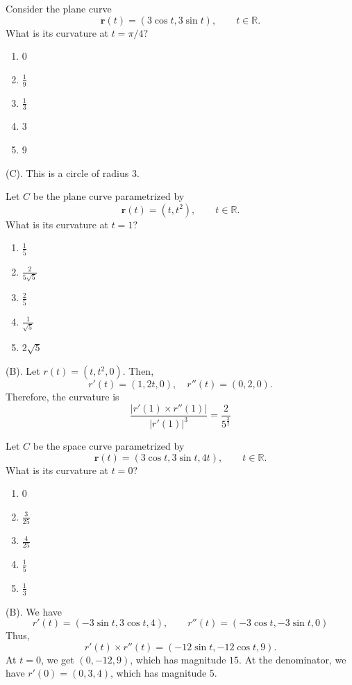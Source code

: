 \begin{exercise}
Consider the plane curve
\[
\mathbf{r}(t)
=
(3\cos t,3\sin t),
\qquad t\in\mathbb{R}.
\]
What is its curvature at $t=\pi/4$?
\begin{enumerate}[label=(\Alph*)]
\item $0$
\item $\frac19$
\item $\frac13$
\item $3$
\item $9$
\end{enumerate}
\end{exercise}
\begin{solution}
(C). This is a circle of radius $3$.
\end{solution}

\begin{exercise}
Let $C$ be the plane curve parametrized by
\[
\mathbf{r}(t)=(t,t^2),
\qquad t\in\mathbb{R}.
\]
What is its curvature at $t=1$?
\begin{enumerate}[label=(\Alph*)]
\item $\frac15$
\item $\frac{2}{5\sqrt5}$
\item $\frac25$
\item $\frac1{\sqrt5}$
\item $2\sqrt5$
\end{enumerate}
\end{exercise}
\begin{solution}
(B). Let $r(t) = (t, t^2, 0)$. Then, 
\[
r'(t) = (1,2t,0), \quad r''(t) = (0,2,0).
\]
Therefore, the curvature is
\[
\frac{|r'(1) \times r''(1)|}{|r'(1)|^3} =  \frac{2}{5^{\frac{3}{2}}}
\]
\end{solution}

\begin{exercise}
Let $C$ be the space curve parametrized by
\[
\mathbf{r}(t)
=
(3\cos t,3\sin t,4t),
\qquad t\in\mathbb{R}.
\]
What is its curvature at $t=0$?
\begin{enumerate}[label=(\Alph*)]
\item $0$
\item $\frac3{25}$
\item $\frac4{25}$
\item $\frac15$
\item $\frac13$
\end{enumerate}
\end{exercise}
\begin{solution}
(B). We have 
\[
r'(t) = (-3 \sin t, 3 \cos t, 4), \qquad r''(t) = (-3\cos t, -3\sin t, 0)
\]
Thus, 
\[
r'(t) \times r''(t) = (-12 \sin t, -12 \cos t, 9).
\]
At $t = 0$, we get $(0,-12,9)$, which has magnitude $15$. At the denominator,
we have $r'(0) = (0,3,4)$, which has magnitude $5$.
\end{solution}


